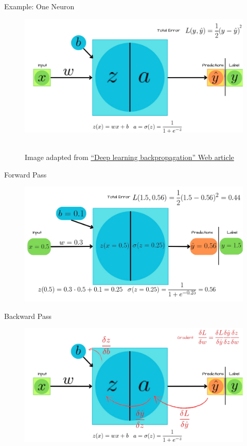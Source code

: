 \documentclass[serif, aspectratio=169]{beamer}
\begin{document}
\begin{frame}{Example: One Neuron}
    
\begin{figure}
\centerline{\includegraphics[width=.9\linewidth, height=\textheight, keepaspectratio]{pic/1.png}}
\\
{\tiny{Image adapted from} \href{https://datamapu.com/posts/deep_learning/backpropagation}{\tiny{“Deep learning backpropagation” Web article}}}

\label{fig}
\end{figure}
\end{frame}

\begin{frame}{Forward Pass}
    \begin{figure}
        \vspace{-0.3cm}
        \includegraphics[width=.9\linewidth, height=\textheight, keepaspectratio]{pic/2.png}
    \end{figure}
\end{frame}

\begin{frame}{Backward Pass}
    \begin{figure}
        \vspace{-0.3cm}
        \includegraphics[width=.9\linewidth, height=\textheight, keepaspectratio]{pic/4.png}
    \end{figure}
\end{frame}
\end{document}
